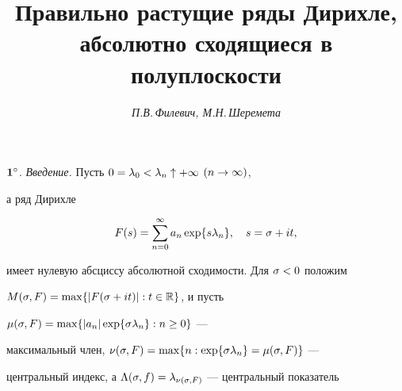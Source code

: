 








\author{\it П.В.\,Филевич, М.Н.\,Шеремета}




\title{Правильно растущие ряды Дирихле,\\


абсолютно сходящиеся в полуплоскости}





\date{}




\pagestyle{plain} %







\maketitle


\label{begin}











$\bold 1^\circ$. {\it Введение.} Пусть $0=\lambda_0<\lambda_n\uparrow+\infty$ $(n\to\infty)$,


а ряд Дирихле


\begin{equation}


F(s)=\sum\limits_{n=0}^{\i}a_n\exp\{s\la_n\},\quad s=\s+it,


\end{equation}


имеет нулевую абсциссу абсолютной сходимости. Для $\sigma<0$ положим 


$M(\sigma,F)=\max\{|F(\sigma+it)|:t\in {\Bbb R}\}$, и пусть 


$\mu (\sigma,F)=\max\{|a_n|\exp\{\sigma\lambda_n\}: n\ge 0\}$ ---


максимальный член, $\nu(\sigma,F)=\max\{n: \exp\{\sigma\lambda_n\}=\mu(\sigma,F)\}$ ---


центральный индекс, а $\Lambda(\sigma,f)=\lambda_{\nu (\sigma,F)}$ --- центральный показатель


